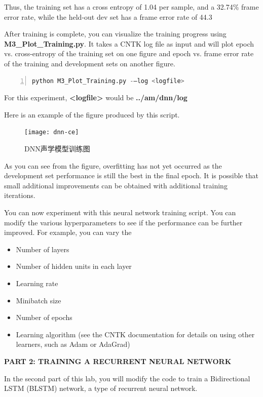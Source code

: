 Thus, the training set has a cross entropy of 1.04 per sample, and a 32.74\% frame error rate, while the held-out dev set has a frame error rate of 44.3%

After training is complete, you can visualize the training progress using {\bf M3\_Plot\_Training.py}. It takes a CNTK log file as input and will plot epoch vs. cross-entropy of the training set on one figure and epoch vs. frame error rate of the training and development sets on another figure.
\begin{lstlisting}[language = python, numbers=left, 
         numberstyle=\tiny,keywordstyle=\color{blue!70},
         commentstyle=\color{red!50!green!50!blue!50},frame=shadowbox,
         rulesepcolor=\color{red!20!green!20!blue!20},basicstyle=\ttfamily]
python M3_Plot_Training.py -–log <logfile>
\end{lstlisting}

For this experiment, {\bf <logfile>} would be {\bf ../am/dnn/log}

Here is an example of the figure produced by this script.
\begin{figure}[htbp]
  \centering
  \texttt{[image: dnn-ce]}
  \caption{DNN声学模型训练图\label{fig:dnn-ce}}
\end{figure}

As you can see from the figure, overfitting has not yet occurred as the development set performance is still the best in the final epoch. It is possible that small additional improvements can be obtained with additional training iterations.

You can now experiment with this neural network training script. You can modify the various hyperparameters to see if the performance can be further improved. For example, you can vary the
\begin{itemize}
  \item Number of layers
  \item Number of hidden units in each layer
  \item Learning rate
  \item Minibatch size
  \item Number of epochs
  \item Learning algorithm (see the CNTK documentation for details on using other learners, such as Adam or AdaGrad)
\end{itemize}

{\bf PART 2: TRAINING A RECURRENT NEURAL NETWORK}

In the second part of this lab, you will modify the code to train a Bidirectional LSTM (BLSTM) network, a type of recurrent neural network.

